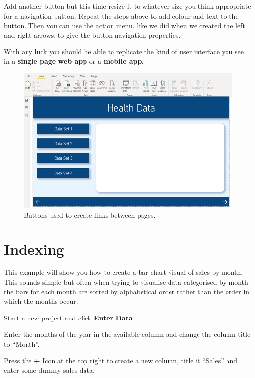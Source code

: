 \documentclass[
]{book}
\begin{document}
Add another button but this time resize it to whatever size you think appropriate for a navigation button. Repeat the steps above to add colour and text to the button. Then you can use the action menu, like we did when we created the left and right arrows, to give the button navigation properties.

With any luck you should be able to replicate the kind of user interface you see in a \textbf{single page web app} or a \textbf{mobile app}.

\begin{figure}
\centering
\includegraphics{bi13.jpg}
\caption{Buttons used to create links between pages.}
\end{figure}

\hypertarget{indexing}{%
\section{Indexing}\label{indexing}}

This example will show you how to create a bar chart visual of sales by month. This sounds simple but often when trying to visualise data categorised by month the bars for each month are sorted by alphabetical order rather than the order in which the months occur.

Start a new project and click \textbf{Enter Data}.

Enter the months of the year in the available column and change the column title to ``Month''.

Press the \textbf{+} Icon at the top right to create a new column, title it ``Sales'' and enter some dummy sales data.
\end{document}
